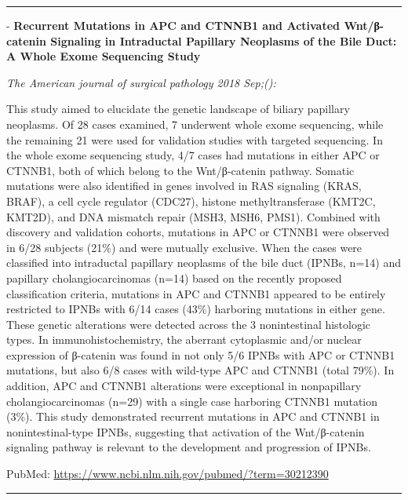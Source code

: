\documentclass[]{article}
\begin{document}
\begin{center}\rule{0.5\linewidth}{\linethickness}\end{center}

 - \textbf{Recurrent Mutations in APC and CTNNB1 and Activated
Wnt/β-catenin Signaling in Intraductal Papillary Neoplasms of the Bile
Duct: A Whole Exome Sequencing Study}

\emph{The American journal of surgical pathology 2018 Sep;():}

This study aimed to elucidate the genetic landscape of biliary papillary
neoplasms. Of 28 cases examined, 7 underwent whole exome sequencing,
while the remaining 21 were used for validation studies with targeted
sequencing. In the whole exome sequencing study, 4/7 cases had mutations
in either APC or CTNNB1, both of which belong to the Wnt/β-catenin
pathway. Somatic mutations were also identified in genes involved in RAS
signaling (KRAS, BRAF), a cell cycle regulator (CDC27), histone
methyltransferase (KMT2C, KMT2D), and DNA mismatch repair (MSH3, MSH6,
PMS1). Combined with discovery and validation cohorts, mutations in APC
or CTNNB1 were observed in 6/28 subjects (21\%) and were mutually
exclusive. When the cases were classified into intraductal papillary
neoplasms of the bile duct (IPNBs, n=14) and papillary
cholangiocarcinomas (n=14) based on the recently proposed classification
criteria, mutations in APC and CTNNB1 appeared to be entirely restricted
to IPNBs with 6/14 cases (43\%) harboring mutations in either gene.
These genetic alterations were detected across the 3 nonintestinal
histologic types. In immunohistochemistry, the aberrant cytoplasmic
and/or nuclear expression of β-catenin was found in not only 5/6 IPNBs
with APC or CTNNB1 mutations, but also 6/8 cases with wild-type APC and
CTNNB1 (total 79\%). In addition, APC and CTNNB1 alterations were
exceptional in nonpapillary cholangiocarcinomas (n=29) with a single
case harboring CTNNB1 mutation (3\%). This study demonstrated recurrent
mutations in APC and CTNNB1 in nonintestinal-type IPNBs, suggesting that
activation of the Wnt/β-catenin signaling pathway is relevant to the
development and progression of IPNBs.

PubMed: \url{https://www.ncbi.nlm.nih.gov/pubmed/?term=30212390}

{}

{}

\begin{center}\rule{0.5\linewidth}{\linethickness}\end{center}
\end{document}
